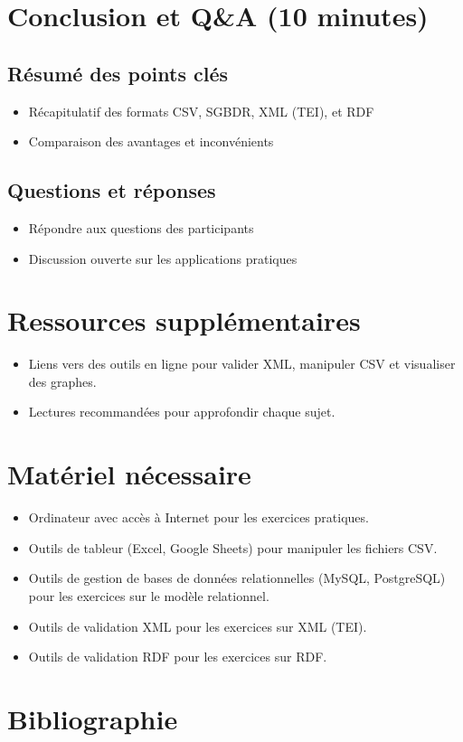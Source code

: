 \documentclass{article}
\begin{document}
\section{Conclusion et Q\&A (10 minutes)}
\subsection{Résumé des points clés}
\begin{itemize}
    \item Récapitulatif des formats CSV, SGBDR, XML (TEI), et RDF
    \item Comparaison des avantages et inconvénients
\end{itemize}

\subsection{Questions et réponses}
\begin{itemize}
    \item Répondre aux questions des participants
    \item Discussion ouverte sur les applications pratiques
\end{itemize}

\section{Ressources supplémentaires}
\begin{itemize}
    \item Liens vers des outils en ligne pour valider XML, manipuler CSV et visualiser des graphes.
    \item Lectures recommandées pour approfondir chaque sujet.
\end{itemize}

\section{Matériel nécessaire}
\begin{itemize}
    \item Ordinateur avec accès à Internet pour les exercices pratiques.
    \item Outils de tableur (Excel, Google Sheets) pour manipuler les fichiers CSV.
    \item Outils de gestion de bases de données relationnelles (MySQL, PostgreSQL) pour les exercices sur le modèle relationnel.
    \item Outils de validation XML pour les exercices sur XML (TEI).
    \item Outils de validation RDF pour les exercices sur RDF.
\end{itemize}

\section{Bibliographie}
\printbibliography
\end{document}
